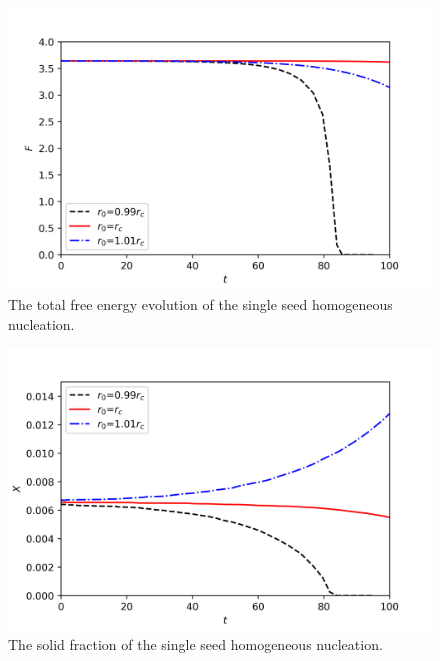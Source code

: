 \documentclass[preprint,12pt]{elsarticle}
\begin{document}
%
\begin{center}
\begin{figure} 
\begin{centering}
\includegraphics[scale=0.65]{free_energy_single_seed.PNG}
\par\end{centering}
\caption{The total free energy evolution of the single seed homogeneous nucleation.} \label{fig:free_energy_single_seed}
\end{figure}
\par\end{center}
%
%
\begin{center}
\begin{figure} 
\begin{centering}
\includegraphics[scale=0.65]{solid_fraction_single_seed.PNG}
\par\end{centering}
\caption{The solid fraction of the single seed homogeneous nucleation.} \label{fig:solid_fraction_single_seed}
\end{figure}
\par\end{center}
\end{document}
